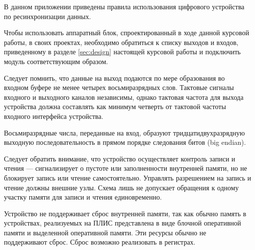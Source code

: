 \label{cha:appendix3}
\setlength{\parindent}{12.5mm}

В данном приложении приведены правила использования цифрового устройства по ресинхронизации данных. 

Чтобы использовать аппаратный блок, спроектированный в ходе данной курсовой работы, в своих проектах, необходимо обратиться к списку выходов и входов, приведенному в разделе \ref{sec:design} настоящей курсовой работы и подключить модуль соответствующим образом.

Следует помнить, что данные на выход подаются по мере образования во входном буфере не менее четырех восьмиразрядных слов. Тактовые сигналы входного и выходного каналов независимы, однако тактовая частота для выхода устройства должна составлять как минимум  четверть от тактовой частоты входного интерфейса устройства.

Восьмиразрядные числа, переданные на вход, образуют тридцатидвухразрядную выходную последовательность в прямом порядке следования битов (big endian). 

Следует обратить внимание, что устройство осуществляет контроль записи и чтения --- сигнализирует о пустоте или заполненности внутренней памяти, но не блокирует запись или чтение самостоятельно. Управлять разрешением на запись и чтение должны внешние узлы. Схема лишь не допускает обращения к одному участку памяти для записи и чтения единовременно.

Устройство не поддерживает сброс внутренней памяти, так как обычно память в устройствах, реализуемых на ПЛИС представлена в виде блочной оперативной памяти и выделенной оперативной памяти. Эти ресурсы обычно не поддерживают сброс. Сброс возможно реализовать в регистрах. 


